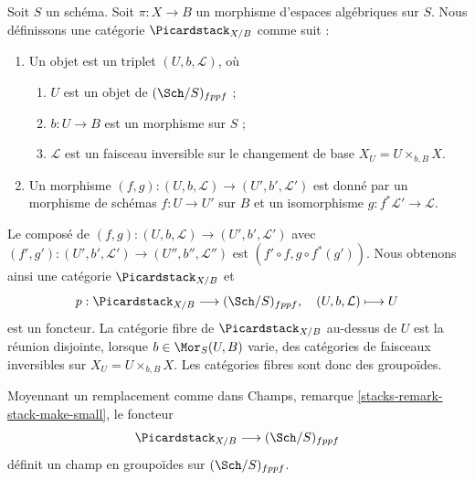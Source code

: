 \medskip\noindent
Soit $S$ un schéma.
Soit $\pi : X \to B$ un morphisme d'espaces algébriques sur $S$.
Nous définissons une catégorie $\Picardstack_{X/B}$ comme suit :
\begin{enumerate}
\item Un objet est un triplet $(U, b, \mathcal{L})$, où
\begin{enumerate}
\item $U$ est un objet de $(\Sch/S)_{fppf}$ ;
\item $b : U \to B$ est un morphisme sur $S$ ;
\item $\mathcal{L}$ est un faisceau inversible sur le changement de base
$X_U = U \times_{b, B} X$.
\end{enumerate}
\item Un morphisme $(f, g) : (U, b, \mathcal{L}) \to (U', b', \mathcal{L}')$
est donné par un morphisme de schémas $f : U \to U'$ sur $B$ et un
isomorphisme $g : f^*\mathcal{L}' \to \mathcal{L}$.
\end{enumerate}
Le composé de
$(f, g) : (U, b, \mathcal{L}) \to (U', b', \mathcal{L}')$
avec
$(f', g') : (U', b', \mathcal{L}') \to (U'', b'', \mathcal{L}'')$
est $(f' \circ f, g \circ f^*(g'))$.
Nous obtenons ainsi une catégorie $\Picardstack_{X/B}$ et
$$
p : \Picardstack_{X/B} \longrightarrow (\Sch/S)_{fppf},
\quad
(U, b, \mathcal{L}) \longmapsto U
$$
est un foncteur. La catégorie fibre de $\Picardstack_{X/B}$ au-dessus de $U$
est la réunion disjointe, lorsque $b \in \Mor_S(U, B)$ varie, des catégories
de faisceaux inversibles sur $X_U = U \times_{b, B} X$. Les catégories
fibres sont donc des groupoïdes.

\begin{lemma}
\label{lemma-picard-stack}
Moyennant un remplacement comme dans
Champs, remarque \ref{stacks-remark-stack-make-small},
le foncteur
$$
\Picardstack_{X/B} \longrightarrow (\Sch/S)_{fppf}
$$
définit un champ en groupoïdes sur $(\Sch/S)_{fppf}$.
\end{lemma}

